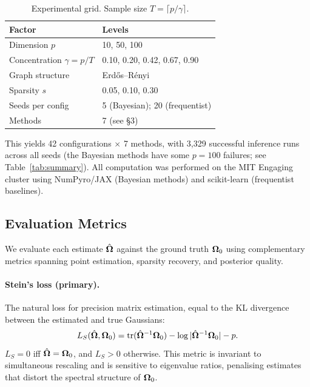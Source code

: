 \documentclass[10pt,conference,compsoc]{IEEEtran}
\newcommand{\tr}{\operatorname{tr}} \newcommand{\KL}{\operatorname{KL}} \newcommand{\ELBO}{\operatorname{ELBO}}
\begin{document}
\begin{table}[ht]
\centering
\caption{Experimental grid. Sample size $T = \lceil p/\gamma \rceil$.}
\label{tab:grid}
\small
\begin{tabular}{@{}ll@{}}
\toprule
\textbf{Factor} & \textbf{Levels} \\
\midrule
Dimension $p$ & 10, 50, 100 \\
Concentration $\gamma = p/T$ & 0.10, 0.20, 0.42, 0.67, 0.90 \\
Graph structure & Erd\H{o}s--R\'{e}nyi \\
Sparsity $s$ & 0.05, 0.10, 0.30 \\
Seeds per config & 5 (Bayesian); 20 (frequentist) \\
Methods & 7 (see \S3) \\
\bottomrule
\end{tabular}
\end{table}

This yields 42 configurations $\times$ 7 methods, with 3{,}329 successful inference runs across all seeds (the Bayesian methods have some $p{=}100$ failures; see Table~\ref{tab:summary}). All computation was performed on the MIT Engaging cluster using NumPyro/JAX (Bayesian methods) and scikit-learn (frequentist baselines).

\subsection{Evaluation Metrics}

We evaluate each estimate $\hat{\bm{\Omega}}$ against the ground truth $\bm{\Omega}_0$ using complementary metrics spanning point estimation, sparsity recovery, and posterior quality.

\paragraph{Stein's loss (primary).} The natural loss for precision matrix estimation, equal to the KL divergence between the estimated and true Gaussians:
\begin{equation}
  L_S(\hat\bOmega, \bOmega_0) = \tr(\hat\bOmega^{-1}\bOmega_0) - \log|\hat\bOmega^{-1}\bOmega_0| - p.
  \label{eq:steins}
\end{equation}
$L_S = 0$ iff $\hat{\bm{\Omega}} = \bm{\Omega}_0$, and $L_S > 0$ otherwise. This metric is invariant to simultaneous rescaling and is sensitive to eigenvalue ratios, penalising estimates that distort the spectral structure of $\bm{\Omega}_0$.
\end{document}
